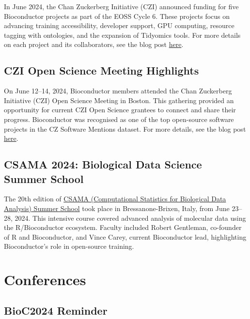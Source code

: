 In June 2024, the Chan Zuckerberg Initiative (CZI) announced funding for five Bioconductor projects as part of the EOSS Cycle 6. These projects focus on advancing training accessibility, developer support, GPU computing, resource tagging with ontologies, and the expansion of Tidyomics tools. For more details on each project and its collaborators, see the blog post \href{https://blog.bioconductor.org/posts/2024-07-12-czi-eoss6-grants/}{here}.

\subsection{CZI Open Science Meeting Highlights}\label{czi-open-science-meeting-highlights}

On June 12--14, 2024, Bioconductor members attended the Chan Zuckerberg Initiative (CZI) Open Science Meeting in Boston. This gathering provided an opportunity for current CZI Open Science grantees to connect and share their progress. Bioconductor was recognised as one of the top open-source software projects in the CZ Software Mentions dataset. For more details, see the blog post \href{https://blog.bioconductor.org/posts/2024-07-24-czi-os-meeting-highlights/}{here}.

\subsection{CSAMA 2024: Biological Data Science Summer School}\label{csama-2024-biological-data-science-summer-school}

The 20th edition of \href{https://csama2024.bioconductor.eu/}{CSAMA (Computational Statistics for Biological Data Analysis) Summer School} took place in Bressanone-Brixen, Italy, from June 23--28, 2024. This intensive course covered advanced analysis of molecular data using the R/Bioconductor ecosystem. Faculty included Robert Gentleman, co-founder of R and Bioconductor, and Vince Carey, current Bioconductor lead, highlighting Bioconductor's role in open-source training.

\section{Conferences}\label{conferences}

\subsection{BioC2024 Reminder}\label{bioc2024-reminder}

